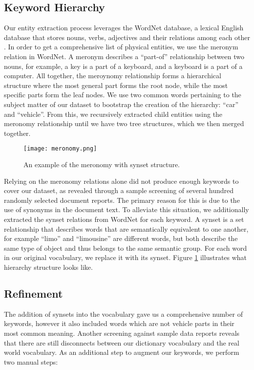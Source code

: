 \subsection{Keyword Hierarchy}
Our entity extraction process leverages the WordNet database, a lexical English
database that stores nouns, verbs, adjectives and their relations among each
other \cite{WORDNET}. In order to get a comprehensive list of physical entities, we use the meronym 
relation in WordNet. A meronym describes a ``part-of'' relationship between two 
nouns, for example, a key is a part of a keyboard, and a keyboard is a part of a computer. 
All together, the meroynomy relationship forms a hierarchical 
structure where the most general part forms the root node, while the most specific 
parts form the leaf nodes. We use two common words pertaining to the subject
matter of our dataset to bootstrap the creation of the hierarchy:
``car'' and ``vehicle''. From this, we recursively extracted child entities
using the meronomy relationship until we have two tree structures, which we then
merged together.

	\begin{figure}
	   \centering  
	   \texttt{[image: meronomy.png]}
	   \caption[Meronomy Structure.]{An example of the meronomy with synset structure.}
	   \label{figure:meronomy}
	\end{figure}


Relying on the meronomy relations alone did not produce enough keywords to cover 
our dataset, as revealed through a sample screening of several hundred randomly 
selected document reports. The primary reason for this is due to the use of synonyms
in the document text. To alleviate this situation, we additionally extracted
the synset relations from WordNet for each keyword. A synset is a set
relationship that describes words that are semantically equivalent to one
another, for example ``limo'' and ``limousine'' are different words, but both
describe the same type of object and thus belongs to the same semantic group.
For each word in our original vocabulary, we replace it with its synset. Figure
\ref{figure:meronomy} illustrates what hierarchy structure looks like.




\subsection{Refinement}
The addition of synsets into the vocabulary gave us a comprehensive number of
keywords, however it also included words which are not vehicle parts in their most
common meaning. Another screening against sample data reports reveals that there are 
still disconnects between our dictionary vocabulary and the real world vocabulary.
As an additional step to augment our keywords, we perform two manual steps:

